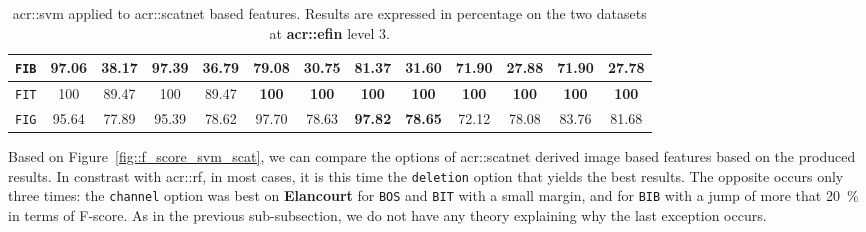 \begin{sidewaystable}[htpb]
\begin{tabular}{| c | c c | c c | c c | c c | c c | c c |}
                    \texttt{FIB} & \textbf{97.06} & \textbf{38.17} & 97.39 & 36.79 & 79.08 & 30.75 & 81.37 & 31.60 & 71.90 & 27.88 & 71.90 & 27.78 \\
                    \hline
                    \texttt{FIT} & 100 & 89.47 & 100 & 89.47 & \textbf{100} & \textbf{100} & \textbf{100} & \textbf{100} & \textbf{100} & \textbf{100} & \textbf{100} & \textbf{100} \\
                    \hline
                    \texttt{FIG} & 95.64 & 77.89 & 95.39 & 78.62 & 97.70 & 78.63 & \textbf{97.82} & \textbf{78.65} & 72.12 & 78.08 & 83.76 & 81.68 \\
                    \hline
                \end{tabular}
                \caption{
                    \label{tab::stats_scat_svm_f3}
                    \gls{acr::svm} applied to \gls{acr::scatnet} based features.
                    Results are expressed in percentage on the two datasets at \textbf{\gls{acr::efin}} level 3.
                }
            \end{sidewaystable}

            Based on Figure~\ref{fig::f_score_svm_scat}, we can compare the options of \gls{acr::scatnet} derived image based features based on the produced results.
            In constrast with \gls{acr::rf}, in most cases, it is this time the \texttt{deletion} option that yields the best results.
            The opposite occurs only three times: the \texttt{channel} option was best on \textbf{Elancourt} for \texttt{BOS} and \texttt{BIT} with a small margin, and for \texttt{BIB} with a jump of more that \SI{20}{\percent} in terms of F-score.
            As in the previous sub-subsection, we do not have any theory explaining why the last exception occurs.\\
    
